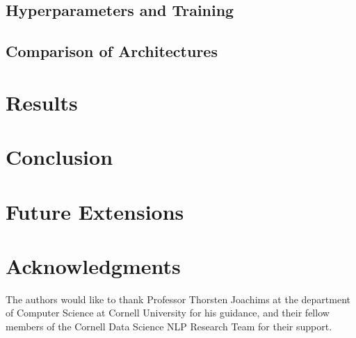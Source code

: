 \documentclass{vldb}
\begin{document}
\subsection{Hyperparameters and Training}

\subsection{Comparison of Architectures}

\section{Results}

\section{Conclusion}

\section{Future Extensions}

\section{Acknowledgments}
The authors would like to thank Professor Thorsten Joachims at the department of Computer Science at Cornell University for his guidance, and their fellow members of the Cornell Data Science NLP Research Team for their support.


  



\begin{appendix}

\end{appendix}
\end{document}
